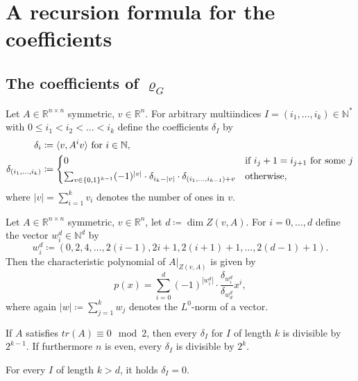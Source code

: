 \documentclass[a4paper,12pt]{article}
\begin{document}
\section{A recursion formula for the coefficients}

\subsection{The coefficients of $\varrho_G$}

\begin{definition}
Let $A \in \mathbb{R}^{n \times n}$ symmetric, $v\in\mathbb{R}^n$. For arbitrary multiindices $I=(i_1, \ldots, i_k) \in \mathbb{N}^*$ with $0 \le i_1 < i_2 < \ldots < i_k$ define the coefficients $\delta_I$ by
\begin{align*}
\delta_i &\coloneqq \langle v, A^iv\rangle \text{ for $i \in \mathbb{N}$},\\
\delta_{(i_1, \ldots, i_k)} &\coloneqq \begin{cases*}
0 & if $i_j+1 = i_{j+1}$ for some $j$\\
\sum_{v\in\{0,1\}^{k-1}}(-1)^{|v|}\cdot\delta_{i_k-|v|}\cdot\delta_{(i_1,\ldots,i_{k-1})+v} & otherwise,
\end{cases*}
\end{align*}
where $|v| = \sum_{i=1}^kv_i$ denotes the number of ones in $v$.
\end{definition}

\begin{claim}
Let $A \in \mathbb{R}^{n \times n}$ symmetric, $v\in\mathbb{R}^n$, let $d \coloneqq \dim Z(v,A)$. For $i=0,\ldots,d$ define the vector $w^d_i\in\mathbb{N}^d$ by 
$$
w^d_i\coloneqq (0,2,4,\ldots, 2(i-1),2i+1,2(i+1)+1, \ldots, 2(d-1)+1).
$$
Then the characteristic polynomial of $A|_{Z(v,A)}$ is given by
$$
p(x) = \sum_{i=0}^d(-1)^{|w^d_i|} \cdot \frac{\delta_{w^d_i}}{\delta_{w^d_d}}x^i,
$$
where again $|w| \coloneqq \sum_{j=1}^k w_j$ denotes the $L^0$-norm of a vector.
\end{claim}

\begin{remark}
If $A$ satisfies $tr(A) \equiv 0 \mod 2$, then every $\delta_I$ for $I$ of length $k$ is divisible by $2^{k-1}$. If furthermore $n$ is even, every $\delta_I$ is divisible by $2^k$.
\end{remark}

\begin{remark}
For every $I$ of length $k > d$, it holds $\delta_I = 0$.
\end{remark}
\end{document}
